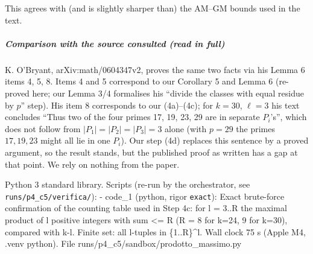 This agrees with (and is slightly sharper than) the AM--GM bounds used
in the text.

\subparagraph{Comparison with the source consulted (read in
full)}\label{comparison-with-the-source-consulted-read-in-full}

K. O'Bryant, arXiv:math/0604347v2, proves the same two facts via his
Lemma 6 items 4, 5, 8. Items 4 and 5 correspond to our Corollary 5 and
Lemma 6 (re-proved here; our Lemma 3/4 formalises his ``divide the
classes with equal residue by \(p\)'' step). His item 8 corresponds to
our (4a)--(4c); for \(k=30\), \(\ell=3\) his text concludes ``Thus two
of the four primes 17, 19, 23, 29 are in separate \(P_i\)'s'', which
does not follow from \(|P_1|=|P_2|=|P_3|=3\) alone (with \(p=29\) the
primes \(17,19,23\) might all lie in one \(P_i\)). Our step (4d)
replaces this sentence by a proved argument, so the result stands, but
the published proof as written has a gap at that point. We rely on
nothing from the paper.


Python 3 standard library. Scripts (re-run by the orchestrator, see
\texttt{runs/p4\_c5/verifica/}): - code\_1 (python, rigor
\texttt{exact}): Exact brute-force confirmation of the counting table
used in Step 4c: for l = 3..\textbar R\textbar{} the maximal product of
l positive integers with sum \textless= \textbar R\textbar{}
(\textbar R\textbar{} = 8 for k=24, 9 for k=30), compared with k-l.
Finite set: all l-tuples in \{1..\textbar R\textbar\}\^{}l. Wall clock
75 s (Apple M4, .venv python). File
runs/p4\_c5/sandbox/prodotto\_massimo.py


